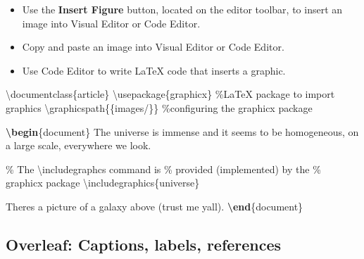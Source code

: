 \documentclass[
  letterpaper,
  DIV=11,
  numbers=noendperiod]{scrartcl}
\newenvironment{Shaded}{\begin{snugshade}}{\end{snugshade}}
\newcommand{\BuiltInTok}[1]{\textcolor[rgb]{0.00,0.23,0.31}{#1}}
\newcommand{\CommentTok}[1]{\textcolor[rgb]{0.37,0.37,0.37}{#1}}
\newcommand{\ExtensionTok}[1]{\textcolor[rgb]{0.00,0.23,0.31}{#1}}
\newcommand{\FunctionTok}[1]{\textcolor[rgb]{0.28,0.35,0.67}{#1}}
\newcommand{\KeywordTok}[1]{\textcolor[rgb]{0.00,0.23,0.31}{\textbf{#1}}}
\newcommand{\NormalTok}[1]{\textcolor[rgb]{0.00,0.23,0.31}{#1}}
\providecommand{\tightlist}{%
  \setlength{\itemsep}{0pt}\setlength{\parskip}{0pt}}\usepackage{longtable,booktabs,array}
\begin{document}
\begin{itemize}
\tightlist
\item
  Use the \textbf{Insert Figure} button, located on the editor toolbar,
  to insert an image into Visual Editor or Code Editor.
\item
  Copy and paste an image into Visual Editor or Code Editor.
\item
  Use Code Editor to write LaTeX code that inserts a graphic.
\end{itemize}

\begin{Shaded}
\begin{Highlighting}[numbers=left,,]
\BuiltInTok{\textbackslash{}documentclass}\NormalTok{\{}\ExtensionTok{article}\NormalTok{\}}
\BuiltInTok{\textbackslash{}usepackage}\NormalTok{\{}\ExtensionTok{graphicx}\NormalTok{\} }\CommentTok{\%LaTeX package to import graphics}
\FunctionTok{\textbackslash{}graphicspath}\NormalTok{\{\{images/\}\} }\CommentTok{\%configuring the graphicx package}
 
\KeywordTok{\textbackslash{}begin}\NormalTok{\{}\ExtensionTok{document}\NormalTok{\}}
\NormalTok{The universe is immense and it seems to be homogeneous, }
\NormalTok{on a large scale, everywhere we look.}

\CommentTok{\% The \textbackslash{}includegraphcs command is }
\CommentTok{\% provided (implemented) by the }
\CommentTok{\% graphicx package}
\BuiltInTok{\textbackslash{}includegraphics}\NormalTok{\{}\ExtensionTok{universe}\NormalTok{\}  }
 
\NormalTok{There\textquotesingle{}s a picture of a galaxy above (trust me yall).}
\KeywordTok{\textbackslash{}end}\NormalTok{\{}\ExtensionTok{document}\NormalTok{\}}
\end{Highlighting}
\end{Shaded}

\subsection{Overleaf: Captions, labels,
references}\label{overleaf-captions-labels-references}
\end{document}
